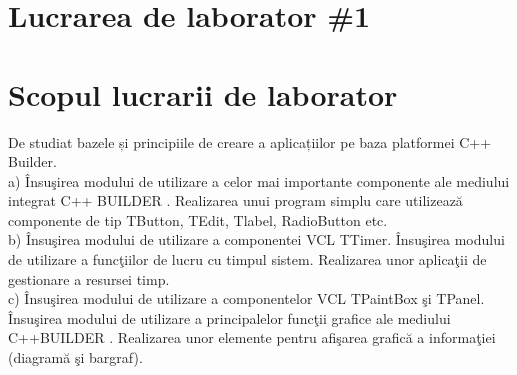 \section*{Lucrarea de laborator \#1}

\section{Scopul lucrarii de laborator}
De studiat bazele și principiile de creare a aplicațiilor pe baza platformei C++ Builder.\\
a) Însuşirea modului de utilizare a celor mai importante componente ale mediului integrat C++
BUILDER .
Realizarea unui program simplu care utilizează componente de tip TButton, TEdit, Tlabel,
RadioButton etc.\\
b) Însuşirea modului de utilizare a componentei VCL TTimer. Însuşirea modului de utilizare a
funcţiilor de lucru cu timpul sistem. Realizarea unor aplicaţii de gestionare a resursei timp.\\
c) Însuşirea modului de utilizare a componentelor VCL TPaintBox şi TPanel. Însuşirea modului
de utilizare a principalelor funcţii grafice ale mediului C++BUILDER . Realizarea unor elemente
pentru afişarea grafică a informaţiei (diagramă şi bargraf).




\clearpage